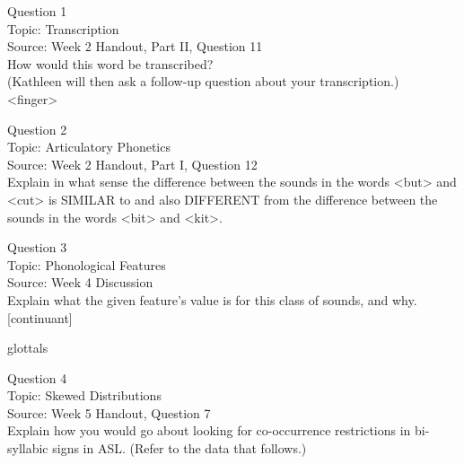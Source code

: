 \documentclass[12pt]{article}
\begin{document}
{\large Question 1}\\

Topic: Transcription\\
Source: Week 2 Handout, Part II, Question 11\\

How would this word be transcribed?\\ (Kathleen will then ask a follow-up question about your transcription.)\\

<finger>


\newpage

{\large Question 2}\\

Topic: Articulatory Phonetics\\
Source: Week 2 Handout, Part I, Question 12\\

Explain in what sense the difference between the sounds in the words <but> and <cut> is SIMILAR to and also DIFFERENT from the difference between the sounds in the words <bit> and <kit>.\\


\newpage

{\large Question 3}\\

Topic: Phonological Features\\
Source: Week 4 Discussion\\

Explain what the given feature’s value is for this class of sounds, and why.\\

{[continuant]}

glottals


\newpage

{\large Question 4}\\

Topic: Skewed Distributions\\
Source: Week 5 Handout, Question 7\\

Explain how you would go about looking for co-occurrence restrictions in bi-syllabic signs in ASL. (Refer to the data that follows.)\\
\end{document}
